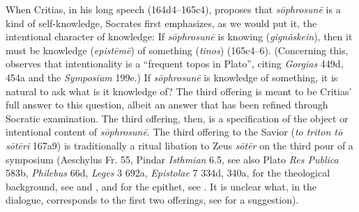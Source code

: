When Critias, in his long speech (164d4–165c4), proposes that \emph{sōphrosunē} is a kind of self-knowledge, Socrates first emphasizes, as we would put it, the intentional character of knowledge: If \emph{sōphrosunē} is knowing (\emph{gignõskein}), then it must be knowledge (\emph{epistēmē}) of something (\emph{tinos}) (165c4–6). (Concerning this, \citealt[232]{Kosman:2014aa} observes that intentionality is a ``frequent topos in Plato'', citing \emph{Gorgias} 449d, 454a and the \emph{Symposium} 199e.) If \emph{sōphrosunē} is knowledge of something, it is natural to ask what is it knowledge of? The third offering is meant to be Critias' full answer to this question, albeit an answer that has been refined through Socratic examination. The third offering, then, is a specification of the object or intentional content of \emph{sōphrosunē}. The third offering to the Savior (\emph{to triton tō sōtēri} 167a9) is traditionally a ritual libation to Zeus \emph{sōtēr} on the third pour of a symposium (Aeschylus Fr. 55, Pindar \emph{Isthmian} 6.5, see also Plato \emph{Res Publica} 583b, \emph{Philebus} 66d, \emph{Leges} 3 692a, \emph{Epistolae} 7 334d, 340a, for the theological background, see \citealt{Cook:1914la} and  \citealt{Jim:2022ay}, and for the epithet, see \citealt{Rothrauff:1966nh}. It is unclear what, in the dialogue, corresponds to the first two offerings, see \citealt[23 n71]{Moore:2019aa} for a suggestion).



